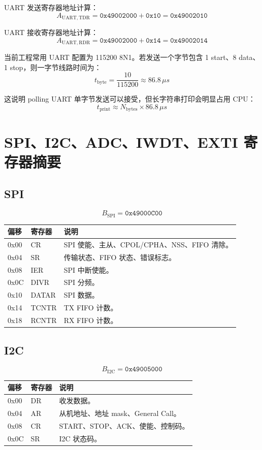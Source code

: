 \documentclass[UTF8,a4paper,11pt]{ctexart}
\newcommand{\addr}[1]{\texttt{#1}}
\begin{document}
UART 发送寄存器地址计算：
\[
  A_{\mathrm{UART,TDR}}
  =
  \addr{0x49002000} + \addr{0x10}
  =
  \addr{0x49002010}
\]

UART 接收寄存器地址计算：
\[
  A_{\mathrm{UART,RDR}}
  =
  \addr{0x49002000} + \addr{0x14}
  =
  \addr{0x49002014}
\]

当前工程常用 UART 配置为 115200 8N1。若发送一个字节包含 1 start、8 data、1 stop，则一字节线路时间为：
\[
  t_{\mathrm{byte}}
  =
  \frac{10}{115200}
  \approx 86.8\,\mu s
\]

这说明 polling UART 单字节发送可以接受，但长字符串打印会明显占用 CPU：
\[
  t_{\mathrm{print}} \approx N_{\mathrm{bytes}} \times 86.8\,\mu s
\]

\section{SPI、I2C、ADC、IWDT、EXTI 寄存器摘要}

\subsection{SPI}

\[
  B_{\mathrm{SPI}} = \addr{0x49000C00}
\]

\begin{center}
\begin{tabular}{>{\ttfamily}p{2cm}p{3cm}p{8cm}}
\toprule
偏移 & 寄存器 & 说明 \\
\midrule
0x00 & CR & SPI 使能、主从、CPOL/CPHA、NSS、FIFO 清除。\\
0x04 & SR & 传输状态、FIFO 状态、错误标志。\\
0x08 & IER & SPI 中断使能。\\
0x0C & DIVR & SPI 分频。\\
0x10 & DATAR & SPI 数据。\\
0x14 & TCNTR & TX FIFO 计数。\\
0x18 & RCNTR & RX FIFO 计数。\\
\bottomrule
\end{tabular}
\end{center}

\subsection{I2C}

\[
  B_{\mathrm{I2C}} = \addr{0x49005000}
\]

\begin{center}
\begin{tabular}{>{\ttfamily}p{2cm}p{3cm}p{8cm}}
\toprule
偏移 & 寄存器 & 说明 \\
\midrule
0x00 & DR & 收发数据。\\
0x04 & AR & 从机地址、地址 mask、General Call。\\
0x08 & CR & START、STOP、ACK、使能、控制码。\\
0x0C & SR & I2C 状态码。\\
\bottomrule
\end{tabular}
\end{center}
\end{document}
